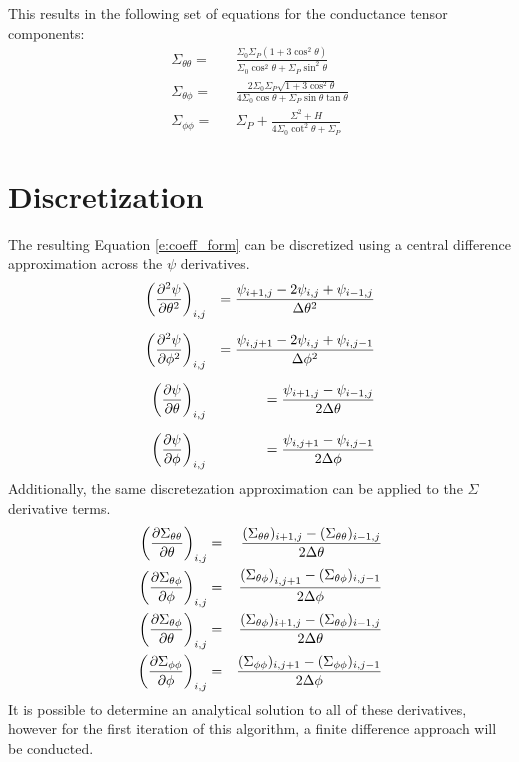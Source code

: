 \documentclass{article}
\begin{document}
This results in the following set of equations for the conductance tensor components:
\begin{align}
    \label{e:sig_thth}\Sigma_{\theta\theta} 
    =&& \frac{\Sigma_0\Sigma_P(1+3\cos^2\theta)}{\Sigma_0\cos^2 \theta+ \Sigma_P\sin^2\theta}\\
    \label{e:sig_thph}\Sigma_{\theta\phi} 
    =&& \frac{2\Sigma_0\Sigma_P\sqrt{1+3\cos^2\theta}}{4\Sigma_0\cos \theta+ \Sigma_P\sin\theta\tan\theta}\\
    \label{e:sig_phph}\Sigma_{\phi\phi} 
    =&& \Sigma_P + \frac{\Sigma^2+H}{4\Sigma_0\cot^2\theta + \Sigma_P}
\end{align}

\section{Discretization}
The resulting Equation \ref{e:coeff_form} can be discretized using a central difference approximation across the $\psi$ derivatives.
\begin{align}
    \left(\pdv[2]{\psi}{\theta}\right)_{i,j} 
    &&= \frac{\psi_{i+1,j} - 2\psi_{i,j} + \psi_{i-1,j}}{\Delta\theta^2}\\[6pt]
    \left(\pdv[2]{\psi}{\phi}\right)_{i,j} 
    &&= \frac{\psi_{i,j+1} - 2\psi_{i,j} + \psi_{i,j-1}}{\Delta\phi^2}\\[6pt]
    \left(\pdv{\psi}{\theta}\right)_{i,j} 
    &&= \frac{\psi_{i+1,j} - \psi_{i-1,j}}{2\Delta\theta}\\[6pt]
    \left(\pdv{\psi}{\phi}\right)_{i,j} 
    &&= \frac{\psi_{i,j+1} - \psi_{i,j-1}}{2\Delta\phi}
\end{align}
Additionally, the same discretezation approximation can be applied to the $\Sigma$ derivative terms.
\begin{align}
    \label{e:dSig_thth_th}\left(\pdv{\Sigma_{\theta\theta}}{\theta}\right)_{i,j} =&& \frac{(\Sigma_{\theta\theta})_{i+1,j} - (\Sigma_{\theta\theta})_{i-1,j}}{2\Delta\theta}\\
    \label{e:dSig_thph_ph}\left(\pdv{\Sigma_{\theta\phi}}{\phi}\right)_{i,j} =&& \frac{\left(\Sigma_{\theta\phi}\right)_{i,j+1} - (\Sigma_{\theta\phi})_{i,j-1}}{2\Delta\phi}\\
    \label{e:dSig_thph_th}\left(\pdv{\Sigma_{\theta\phi}}{\theta}\right)_{i,j} =&& \frac{(\Sigma_{\theta\phi})_{i+1,j}- (\Sigma_{\theta\phi})_{i-1,j}}{2\Delta\theta}\\
    \label{e:dSig_phph_ph}\left(\pdv{\Sigma_{\phi\phi}}{\phi}\right)_{i,j} =&& \frac{(\Sigma_{\phi\phi})_{i,j+1} - (\Sigma_{\phi\phi})_{i,j-1}}{2\Delta\phi}
\end{align}
It is possible to determine an analytical solution to all of these derivatives, however for the first iteration of this algorithm, a finite difference approach will be conducted.
\end{document}
